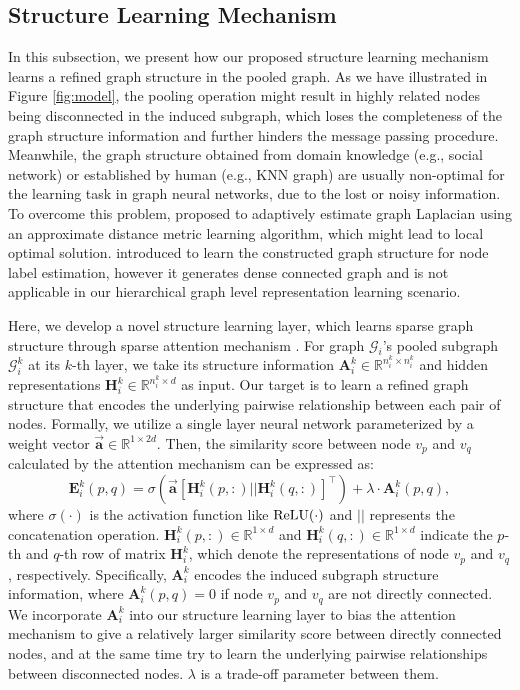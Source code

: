 \documentclass[letterpaper]{article} \usepackage{aaai20}  \usepackage{times}  \usepackage{helvet} \usepackage{courier}  \usepackage[hyphens]{url}  \usepackage{graphicx} \urlstyle{rm} \def\UrlFont{\rm}  \usepackage{graphicx}  \frenchspacing  \setlength{\pdfpagewidth}{8.5in}  \setlength{\pdfpageheight}{11in}
\begin{document}
\subsection{Structure Learning Mechanism}
In this subsection, we present how our proposed structure learning mechanism learns a refined graph structure in the pooled graph. As we have illustrated in Figure \ref{fig:model}, the pooling operation might result in highly related nodes being disconnected in the induced subgraph, which loses the completeness of the graph structure information and further hinders the message passing procedure. Meanwhile, the graph structure obtained from domain knowledge (e.g., social network) or established by human (e.g., KNN graph) are usually non-optimal for the learning task in graph neural networks, due to the lost or noisy information. To overcome this problem, \cite{li2018adaptive} proposed to adaptively estimate graph Laplacian using an approximate distance metric learning algorithm, which might lead to local optimal solution. \cite{jiang2019semi} introduced to learn the constructed graph structure for node label estimation, however it generates dense connected graph and is not applicable in our hierarchical graph level representation learning scenario. 

Here, we develop a novel structure learning layer, which learns sparse graph structure through sparse attention mechanism \cite{martins2016softmax}. For graph $\mathcal{G}_i$'s pooled subgraph $\mathcal{G}_i^k$ at its $k$-th layer, we take its structure information $\mathbf{A}_i^k \in \mathbb{R}^{n_i^k \times n_i^k}$ and hidden representations $\mathbf{H}_i^k \in \mathbb{R}^{n_i^k \times d}$ as input. Our target is to learn a refined graph structure that encodes the underlying pairwise relationship between each pair of nodes. Formally, we utilize a single layer neural network parameterized by a weight vector $\stackrel{\rightarrow}{\mathbf{a}} \in \mathbb{R}^{1 \times 2d}$. Then, the similarity score between node $v_p$ and $v_q$ calculated by the attention mechanism can be expressed as:
\begin{equation}
	\mathbf{E}_i^k(p,q) = {\sigma}(\stackrel{\rightarrow}{\mathbf{a}}[\mathbf{H}_i^k(p,:)||\mathbf{H}_i^k(q,:)]^{\top}) + \lambda\cdot\mathbf{A}_i^k(p,q),
\end{equation}
where $\sigma(\cdot)$ is the activation function like ${\rm ReLU}(\cdot)$ and $||$ represents the concatenation operation. $\mathbf{H}_i^k(p,:) \in \mathbb{R}^{1 \times d}$ and $\mathbf{H}_i^k(q,:) \in \mathbb{R}^{1 \times d}$ indicate the $p$-th and $q$-th row of matrix $\mathbf{H}_i^k$, which denote the representations of node $v_p$ and $v_q$, respectively. Specifically, $\mathbf{A}_i^k$ encodes the induced subgraph structure information, where $\mathbf{A}_i^k(p,q) = 0$ if node $v_p$ and $v_q$ are not directly connected. We incorporate $\mathbf{A}_i^k$ into our structure learning layer to bias the attention mechanism to give a relatively larger similarity score between directly connected nodes, and at the same time try to learn the underlying pairwise relationships between disconnected nodes. $\lambda$ is a trade-off parameter between them.
\end{document}
